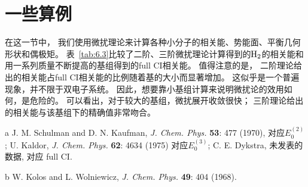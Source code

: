 \section{一些算例}
在这一节中，
我们使用微扰理论来计算各种小分子的相关能、势能面、平衡几何形状和偶极矩。
表~\ref{tab:6.3}比较了二阶、三阶微扰理论计算得到的$\hd$的相关能和用一系列质量不断提高的基组得到的full CI相关能。
值得注意的是，
二阶理论给出的相关能占full CI相关能的比例随着基的大小而显著增加。
这似乎是一个普遍现象，并不限于双电子系统。
因此，想要靠小基组计算来说明微扰论的效用如何，是危险的。
可以看出，对于较大的基组，微扰展开收敛很快；
三阶理论给出的相关能与该基组下的精确值非常吻合。
\begin{table}[H]
	\centering
	\caption{$R=1.4$时$\hd$的关联能(a.u.)}
	\begin{threeparttable}
		\begin{tablenotes}
			\item[a] J. M. Schulman and D. N. Kaufman, \textit{J. Chem. Phys.} \textbf{53}: 477 (1970), 对应$E_0^{(2)}$; U. Kaldor, \textit{J. Chem. Phys.} \textbf{62}: 4634 (1975) 对应$E_0^{(3)}$; C. E. Dykstra, 未发表的数据, 对应 full CI.
			\item[b] W. Kolos and L. Wolniewicz, \textit{J. Chem. Phys.} \textbf{49}: 404 (1968).
		\end{tablenotes}
	\end{threeparttable}
	\label{tab:6.3}
\end{table}
